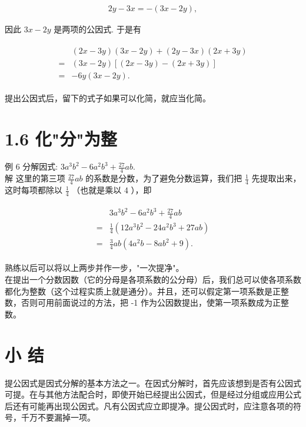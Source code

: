 \documentclass[10pt]{article}
\begin{document}
\begin{align*}
2 y-3 x=-(3 x-2 y),
\end{align*}

因此 $3 x-2 y$ 是两项的公因式. 于是有

\begin{align*}
\begin{aligned}
& (2 x-3 y)(3 x-2 y)+(2 y-3 x)(2 x+3 y) \\
= & (3 x-2 y)[(2 x-3 y)-(2 x+3 y)] \\
= & -6 y(3 x-2 y) .
\end{aligned}
\end{align*}

提出公因式后，留下的式子如果可以化简，就应当化简。

\section*{1.6 化"分"为整}
例 6 分解因式: $3 a^{3} b^{2}-6 a^{2} b^{3}+\frac{27}{4} a b$.\\
解 这里的第三项 $\frac{27}{4} a b$ 的系数是分数，为了避免分数运算，我们把 $\frac{1}{4}$ 先提取出来，这时每项都除以 $\frac{1}{4}$ （也就是乘以 4 ），即

\begin{align*}
\begin{aligned}
& 3 a^{3} b^{2}-6 a^{2} b^{3}+\frac{27}{4} a b \\
= & \frac{1}{4}\left(12 a^{3} b^{2}-24 a^{2} b^{3}+27 a b\right) \\
= & \frac{3}{4} a b\left(4 a^{2} b-8 a b^{2}+9\right) .
\end{aligned}
\end{align*}

熟练以后可以将以上两步并作一步，"一次提净"。\\
在提出一个分数因数（它的分母是各项系数的公分母）后，我们总可以使各项系数都化为整数（这个过程实质上就是通分）。并且，还可以假定第一项系数是正整数，否则可用前面说过的方法，把 -1 作为公因数提出，使第一项系数成为正整数。

\section*{小 结}
提公因式是因式分解的基本方法之一。在因式分解时，首先应该想到是否有公因式可提。在与其他方法配合时，即使开始已经提出公因式，但是经过分组或应用公式后还有可能再出现公因式。凡有公因式应立即提净。提公因式时，应注意各项的符号，千万不要漏掉一项。
\end{document}

